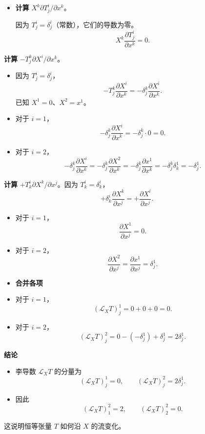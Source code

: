 \begin{itemize}
  \item \textbf{计算} $X^k\partial T^i_j/\partial x^k$。

  因为 $T^i_j=\delta^i_j$（常数），它们的导数为零。
  \[
    X^k\frac{\partial T^i_j}{\partial x^k}=0.
  \]
\end{itemize}

\textbf{计算} $-T^k_j\partial X^i/\partial x^k$。
\begin{itemize}
  \item 因为 $T^i_j=\delta^i_j$，
  \[
    -T^k_j\frac{\partial X^i}{\partial x^k}
       =-\delta^k_j\frac{\partial X^i}{\partial x^k}.
  \]
  已知 $X^1=0$、$X^2=x^1$。
  \item 对于 $i=1$，
  \[
    -\delta^k_j\frac{\partial X^i}{\partial x^k}=-\delta^k_j\cdot0=0.
  \]
  \item 对于 $i=2$，
  \[
    -\delta^k_j\frac{\partial X^i}{\partial x^k}
       =-\delta^k_j\frac{\partial X^2}{\partial x^k}
       =-\delta^k_j\frac{\partial x^1}{\partial x^k}
       =-\delta^k_j\delta^1_k=-\delta^1_j.
  \]
\end{itemize}

\textbf{计算} $+T^i_k\partial X^k/\partial x^j$。因为 $T^i_k=\delta^i_k$，
\[
  +\delta^i_k\frac{\partial X^k}{\partial x^j}=+\frac{\partial X^i}{\partial x^j}.
\]
\begin{itemize}
  \item 对于 $i=1$，
  \[
    \frac{\partial X^1}{\partial x^j}=0.
  \]
  \item 对于 $i=2$，
  \[
    \frac{\partial X^2}{\partial x^j}=\frac{\partial x^1}{\partial x^j}=\delta^1_j.
  \]
\end{itemize}

\begin{itemize}
  \item \textbf{合并各项}
  \item 对于 $i=1$，
  \[
    (\mathcal L_X T)^1_j=0+0+0=0.
  \]
  \item 对于 $i=2$，
  \[
    (\mathcal L_X T)^2_j=0-(-\delta^1_j)+\delta^1_j=2\delta^1_j.
  \]
\end{itemize}

\textbf{结论}
\begin{itemize}
  \item 李导数 $\mathcal L_X T$ 的分量为
  \[
    (\mathcal L_X T)^1_j=0,\qquad
    (\mathcal L_X T)^2_j=2\delta^1_j.
  \]
  \item 因此
  \[
    (\mathcal L_X T)^2_1=2,\qquad(\mathcal L_X T)^2_2=0.
  \]
\end{itemize}
这说明恒等张量 $T$ 如何沿 $X$ 的流变化。

